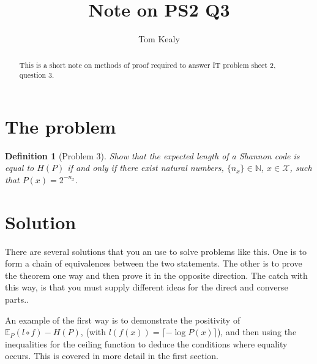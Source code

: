 \documentclass[11pt]{article}
\newtheorem{definition}{Definition}[section]
\begin{document}
\title{Note on PS2 Q3}
\author{Tom Kealy}
\maketitle
\begin{abstract}
This is a short note on methods of proof required to answer IT problem sheet 2, question 3.
\end{abstract}

\section{The problem}
\begin{definition}[Problem 3]
Show that the expected length of a Shannon code is equal to \(H\left(P\right)\) if and only if there exist natural numbers, \(\{n_x\} \in \mathbb{N}\), \(x \in \mathcal{X}\), such that \(P\left(x\right) = 2^{-n_x}\).
\end{definition}

\section{Solution}
There are several solutions that you an use to solve problems like this. One is to form a chain of equivalences between the two statements. The other is to prove the theorem one way and then prove it in the opposite direction. The catch with this way, is that you must supply different ideas for the direct and converse parts..

An example of the first way is to demonstrate the positivity of \(\mathbb{E}_P\left(l\circ f\right) - H\left(P\right)\), (with \(l\left(f\left(x\right)\right) = \lceil -\log{P\left(x\right)}\rceil\)), and then using the inequalities for the ceiling function to deduce the conditions where equality occurs. This is covered in more detail in the first section.
\end{document}
